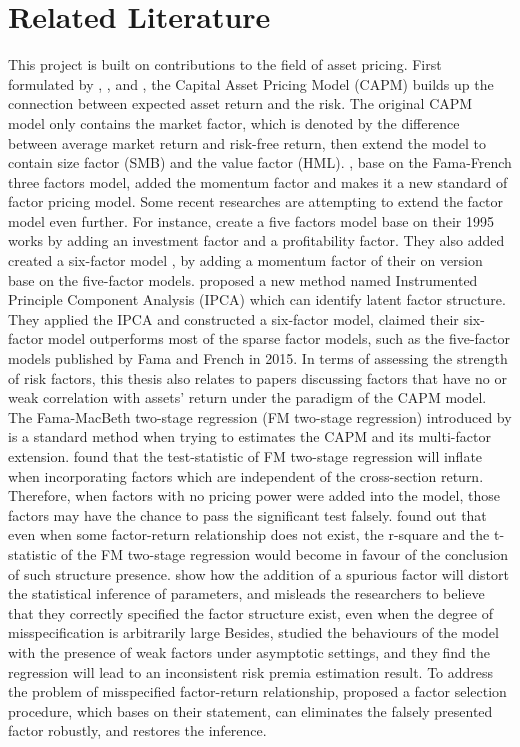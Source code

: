 	\chapter{Related Literature}\label{Literature}
This project is built on contributions to the field of asset pricing.
First formulated by , , and , the Capital Asset Pricing Model (CAPM) builds up the connection between expected asset return and the risk.
The original CAPM model only contains the market factor, which is denoted by the difference between average market return and risk-free return, then extend the model to contain size factor (SMB) and the value factor (HML).
, base on the Fama-French three factors model, added the momentum factor and makes it a new standard of factor pricing model.
Some recent researches are attempting to extend the factor model even further.
For instance,  create a five factors model base on their 1995 works by adding an investment factor and a profitability factor.
They also added created a six-factor model \cite{Fama2018}, by adding a momentum factor of their on version base on the five-factor models.
 proposed a new method named Instrumented Principle Component Analysis (IPCA) which can identify latent factor structure.
They applied the IPCA and constructed a six-factor model, claimed their six-factor model outperforms most of the sparse factor models, such as the five-factor models published by Fama and French in 2015.
In terms of assessing the strength of risk factors, this thesis also relates to papers discussing factors that have no or weak correlation with assets' return under the paradigm of the CAPM model.
The Fama-MacBeth two-stage regression (FM two-stage regression) introduced by  is a standard method when trying to estimates the CAPM and its multi-factor extension. 
 found that the test-statistic of FM two-stage regression will inflate when incorporating factors which are independent of the cross-section return.
Therefore, when factors with no pricing power were added into the model, those factors may have the chance to pass the significant test falsely.
 found out that even when some factor-return relationship does not exist, the r-square and the t-statistic of the FM two-stage regression would become in favour of the conclusion of such structure presence. 
 show how the addition of a spurious factor will distort the statistical inference of parameters, and misleads the researchers to believe that they correctly specified the factor structure exist, even when the degree of misspecification is arbitrarily large
Besides,  studied the behaviours of the model with the presence of weak factors under asymptotic settings, and they find the regression will lead to an inconsistent risk premia estimation result.
To address the problem of misspecified factor-return relationship,  proposed a factor selection procedure, which bases on their statement, can eliminates the falsely presented factor robustly, and restores the inference. 
	
